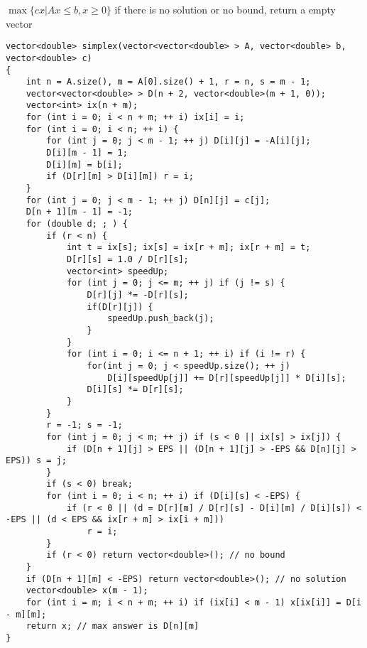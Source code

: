 $\max\{cx | Ax \leq b, x \geq 0\}$
if there is no solution or no bound, return a empty vector
\begin{lstlisting}
vector<double> simplex(vector<vector<double> > A, vector<double> b, vector<double> c)
{
	int n = A.size(), m = A[0].size() + 1, r = n, s = m - 1;
	vector<vector<double> > D(n + 2, vector<double>(m + 1, 0));
	vector<int> ix(n + m);
	for (int i = 0; i < n + m; ++ i) ix[i] = i;
	for (int i = 0; i < n; ++ i) {
		for (int j = 0; j < m - 1; ++ j) D[i][j] = -A[i][j];
		D[i][m - 1] = 1;
		D[i][m] = b[i];
		if (D[r][m] > D[i][m]) r = i;
	}
	for (int j = 0; j < m - 1; ++ j) D[n][j] = c[j];
	D[n + 1][m - 1] = -1;
	for (double d; ; ) {
		if (r < n) {
			int t = ix[s]; ix[s] = ix[r + m]; ix[r + m] = t;
			D[r][s] = 1.0 / D[r][s];
			vector<int> speedUp;
			for (int j = 0; j <= m; ++ j) if (j != s) {
				D[r][j] *= -D[r][s];
				if(D[r][j]) {
					speedUp.push_back(j);
				}
			}
			for (int i = 0; i <= n + 1; ++ i) if (i != r) {
				for(int j = 0; j < speedUp.size(); ++ j)
					D[i][speedUp[j]] += D[r][speedUp[j]] * D[i][s];
				D[i][s] *= D[r][s];
			}
		}
		r = -1; s = -1;
		for (int j = 0; j < m; ++ j) if (s < 0 || ix[s] > ix[j]) {
			if (D[n + 1][j] > EPS || (D[n + 1][j] > -EPS && D[n][j] > EPS)) s = j;
		}
		if (s < 0) break;
		for (int i = 0; i < n; ++ i) if (D[i][s] < -EPS) {
			if (r < 0 || (d = D[r][m] / D[r][s] - D[i][m] / D[i][s]) < -EPS || (d < EPS && ix[r + m] > ix[i + m]))
				r = i;
		}
		if (r < 0) return vector<double>(); // no bound
	}
	if (D[n + 1][m] < -EPS) return vector<double>(); // no solution
	vector<double> x(m - 1);
	for (int i = m; i < n + m; ++ i) if (ix[i] < m - 1) x[ix[i]] = D[i - m][m];
	return x; // max answer is D[n][m]
}
\end{lstlisting}